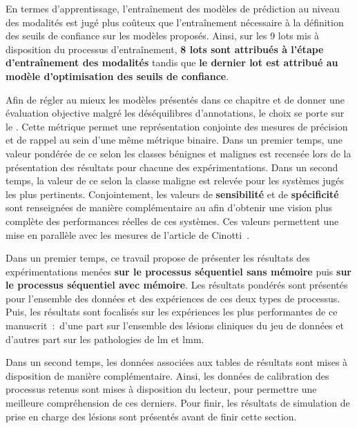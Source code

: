 En termes d'apprentissage, l'entraînement des modèles de prédiction au niveau des modalités est jugé plus coûteux que l'entraînement nécessaire à la définition des seuils de confiance sur les modèles proposés. Ainsi, sur les 9 lots mis à disposition du processus d'entraînement, \textbf{8 lots sont attribués à l'étape d'entraînement des modalités} tandis que \textbf{le dernier lot est attribué au modèle d'optimisation des seuils de confiance}.\par

Afin de régler au mieux les modèles présentés dans ce chapitre et de donner une évaluation objective malgré les déséquilibres d'annotations, le choix se porte sur le \textbf{\fscore{}}. Cette métrique permet une représentation conjointe des mesures de précision et de rappel au sein d'une même métrique binaire. Dans un premier temps, une valeur pondérée de ce \fscore{} selon les classes bénignes et malignes est recensée lors de la présentation des résultats pour chacune des expérimentations. Dans un second temps, la valeur de ce \fscore{} selon la classe maligne est relevée pour les systèmes jugés les plus pertinents. Conjointement, les valeurs de \textbf{sensibilité} et de \textbf{spécificité} sont renseignées de manière complémentaire au \fscore{} afin d'obtenir une vision plus complète des performances réelles de ces systèmes. Ces valeurs permettent une mise en parallèle avec les mesures de l'article de Cinotti~.\par

Dans un premier temps, ce travail propose de présenter les résultats des expérimentations menées \textbf{sur le processus séquentiel sans mémoire} puis \textbf{sur le processus séquentiel avec mémoire}. Les résultats pondérés sont présentés pour l'ensemble des données et des expériences de ces deux types de processus. Puis, les résultats sont focalisés sur les expériences les plus performantes de ce manuscrit~:~d'une part sur l'ensemble des lésions cliniques du jeu de données et d'autres part sur les pathologies de \gls{lm} et \gls{lmm}.\par

Dans un second temps, les données associées aux tables de résultats sont mises à disposition de manière complémentaire. Ainsi, les données de calibration des processus retenus sont mises à disposition du lecteur, pour permettre une meilleure compréhension de ces derniers. Pour finir, les résultats de simulation de prise en charge des lésions sont présentés avant de finir cette section.\par
\clearpage

